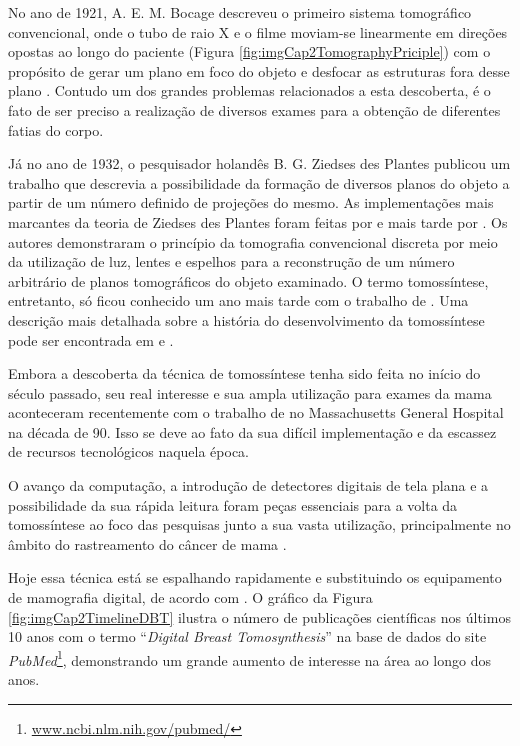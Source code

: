 No ano de 1921, A. E. M. Bocage descreveu o primeiro sistema tomográfico convencional, onde o tubo de raio X e o filme moviam-se linearmente em direções opostas ao longo do paciente (Figura \ref{fig:imgCap2TomographyPriciple}) com o propósito de gerar um plano em foco do objeto e desfocar as estruturas fora desse plano \cite{hsieh2009computed}. Contudo um dos grandes problemas relacionados a esta descoberta, é o fato de ser preciso a realização de diversos exames para a obtenção de diferentes fatias do corpo. 

Já no ano de 1932, o pesquisador holandês B. G. Ziedses des Plantes publicou um trabalho \cite{des1932neue} que descrevia a possibilidade da formação de diversos planos do objeto a partir de um número definido de projeções do mesmo. As implementações mais marcantes da teoria de Ziedses des Plantes foram feitas por  e mais tarde por . Os autores demonstraram o princípio da tomografia convencional discreta por meio da utilização de luz, lentes e espelhos para a reconstrução de um número arbitrário de planos tomográficos do objeto examinado. O termo tomossíntese, entretanto, só ficou conhecido um ano mais tarde com o trabalho de . Uma descrição mais detalhada sobre a história do desenvolvimento da tomossíntese pode ser encontrada em   e . 

Embora a descoberta da técnica de tomossíntese tenha sido feita no início do século passado, seu real interesse e sua ampla utilização para exames da mama aconteceram recentemente com o trabalho de   no Massachusetts General Hospital na década de 90. Isso se deve ao fato da sua difícil implementação e da escassez de recursos tecnológicos naquela época. 

O avanço da computação, a introdução de detectores digitais de tela plana e a possibilidade da sua rápida leitura foram peças essenciais para a volta da tomossíntese ao foco das pesquisas junto a sua vasta utilização, principalmente no âmbito do rastreamento do câncer de mama \cite{Niklason20185}. 

Hoje essa técnica está se espalhando rapidamente e substituindo os equipamento de mamografia digital, de acordo com . O gráfico da Figura \ref{fig:imgCap2TimelineDBT} ilustra o número de publicações científicas nos últimos 10 anos com o termo ``\textit{Digital Breast Tomosynthesis}'' na base de dados do site \textit{PubMed}\footnote{\url{www.ncbi.nlm.nih.gov/pubmed/}}, demonstrando um grande aumento de interesse na área ao longo dos anos.

